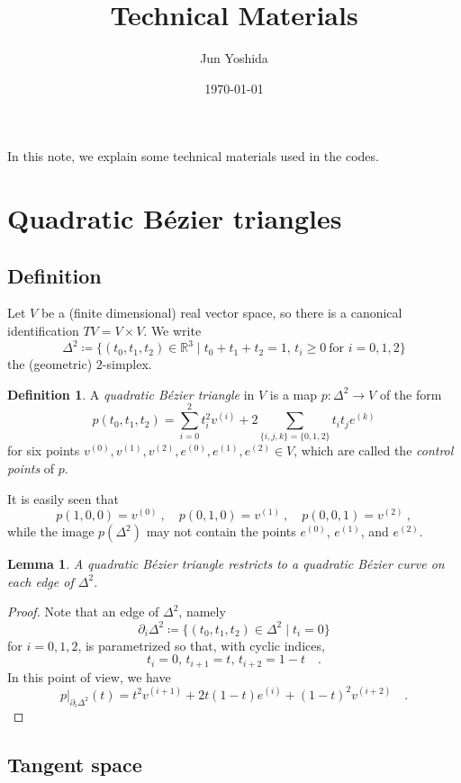 \documentclass[pdftex,a4paper,12pt]{scrartcl}
\title{Technical Materials}
\author{Jun Yoshida}
\date{\today}
\theoremstyle{plain}
\newtheorem{lemma}[theorem]{Lemma}
\theoremstyle{definition}
\newtheorem*{definition}{Definition}
\theoremstyle{remark}
\begin{document}
\maketitle

In this note, we explain some technical materials used in the codes.

\section{Quadratic B\'ezier triangles}
\label{sec:qbezier}

\subsection{Definition}

Let $V$ be a (finite dimensional) real vector space, so there is a canonical identification $TV=V\times V$.
We write
\[
\Delta^2\coloneqq\{(t_0,t_1,t_2)\in\mathbb R^3\mid t_0+t_1+t_2=1,\,t_i\ge0\ \text{for $i=0,1,2$}\}
\]
the (geometric) $2$-simplex.

\begin{definition}
A \emph{quadratic B\'ezier triangle} in $V$ is a map $p:\Delta^2\to V$ of the form
\[
p(t_0,t_1,t_2)
= \sum_{i=0}^2 t_i^2 v^{(i)}+2\sum_{\{i,j,k\}=\{0,1,2\}} t_i t_je^{(k)}
\]
for six points $v^{(0)},v^{(1)},v^{(2)},e^{(0)},e^{(1)},e^{(2)}\in V$, which are called the \emph{control points} of $p$.
\end{definition}

It is easily seen that
\[
p(1,0,0) = v^{(0)}
\ ,\quad p(0,1,0) = v^{(1)}
\ ,\quad p(0,0,1) = v^{(2)}
\ ,
\]
while the image $p(\Delta^2)$ may not contain the points $e^{(0)}$, $e^{(1)}$, and $e^{(2)}$.

\begin{lemma}
A quadratic B\'ezier triangle restricts to a quadratic B\'ezier curve on each edge of $\Delta^2$.
\end{lemma}
\begin{proof}
Note that an edge of $\Delta^2$, namely
\[
\partial_i\Delta^2\coloneqq \{(t_0,t_1,t_2)\in\Delta^2\mid t_i=0\}
\]
for $i=0,1,2$, is parametrized so that, with cyclic indices,
\[
t_i=0
,\,
t_{i+1}=t
,\,
t_{i+2}=1-t
\quad.
\]
In this point of view, we have
\[
\left.p\right|_{\partial_i\Delta^2}(t)
= t^2v^{(i+1)} + 2t(1-t) e^{(i)} + (1-t)^2 v^{(i+2)}
\quad.
\]
\end{proof}

\subsection{Tangent space}
\end{document}
